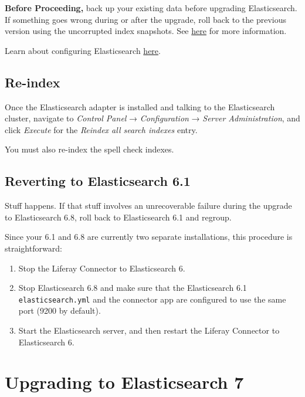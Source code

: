 \noindent\hrulefill

\textbf{Before Proceeding,} back up your existing data before upgrading
Elasticsearch. If something goes wrong during or after the upgrade, roll
back to the previous version using the uncorrupted index snapshots. See
\href{/docs/7-2/deploy/-/knowledge_base/d/backing-up-elasticsearch}{here}
for more information.

\noindent\hrulefill

Learn about configuring Elasticsearch
\href{/docs/7-2/deploy/-/knowledge_base/d/configuring-the-liferay-elasticsearch-connector}{here}.

\section{Re-index}\label{re-index-1}

Once the Elasticsearch adapter is installed and talking to the
Elasticsearch cluster, navigate to \emph{Control Panel} →
\emph{Configuration} → \emph{Server Administration}, and click
\emph{Execute} for the \emph{Reindex all search indexes} entry.

You must also re-index the spell check indexes.

\section{Reverting to Elasticsearch
6.1}\label{reverting-to-elasticsearch-6.1-1}

Stuff happens. If that stuff involves an unrecoverable failure during
the upgrade to Elasticsearch 6.8, roll back to Elasticsearch 6.1 and
regroup.

Since your 6.1 and 6.8 are currently two separate installations, this
procedure is straightforward:

\begin{enumerate}
\def\labelenumi{\arabic{enumi}.}
\item
  Stop the Liferay Connector to Elasticsearch 6.
\item
  Stop Elasticsearch 6.8 and make sure that the Elasticsearch 6.1
  \texttt{elasticsearch.yml} and the connector app are configured to use
  the same port (9200 by default).
\item
  Start the Elasticsearch server, and then restart the Liferay Connector
  to Elasticsearch 6.
\end{enumerate}

\chapter{Upgrading to Elasticsearch
7}\label{upgrading-to-elasticsearch-7}

